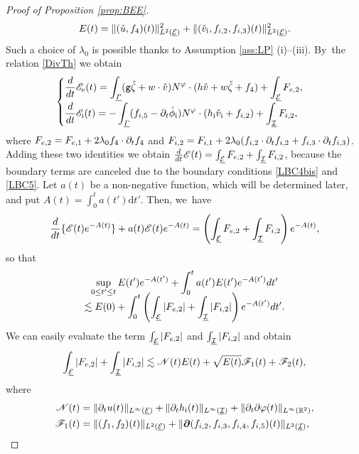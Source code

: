 \documentclass[11pt]{article}
\providecommand{\dpl}{\displaystyle}
\let\dpl\displaystyle
\newcommand{\gr}{{\mathtt g}}
\newcommand{\R}{{\mathbb R}}
\newcommand{\dt}{\partial_t}
\newcommand{\cI}{{\mathcal I}}
\newcommand{\cE}{{\mathcal E}}
\newcommand{\ul}[1]{\underline{#1}}
\newcommand{\itGamma}{\mathit{\Gamma}}
\theoremstyle{definition}
\begin{document}
\begin{proof}[Proof of Proposition \ref{prop:BEE}]
\[
E(t)=\|(\check{u},f_4)(t)\|_{L^2(\ul{\cE})}^2+\|(\check{v}_\mathrm{i},f_{{\rm i},2},f_{{\rm i},3})(t)\|_{L^2(\ul{\cE})}^2.
\]
Such a choice of $\lambda_0$ is possible thanks to Assumption \ref{ass:LP} (i)--(iii). By~the relation \eqref{DivTh} we obtain
\begin{equation}\label{BEI}
\begin{cases}
\dpl\frac{\rm d}{{\rm d}t}\mathscr{E}_\mathrm{e}(t) = \int_{\ul{\itGamma}}(\gr\check{\zeta}+w\cdot\check{v})N^\varphi\cdot(h\check{v}+w\check{\zeta}+f_4)
+ \int_{\ul{\cE}}F_{{\rm e},2}, \\[8pt]
\dpl\frac{\rm d}{{\rm d}t}\mathscr{E}_\mathrm{i}(t) = -\int_{\ul{\itGamma}}(f_{{\rm i},5}-\dt\check{\phi}_\mathrm{i})N^\varphi\cdot(h_\mathrm{i}\check{v}_\mathrm{i}+f_{{\rm i},2})
+ \int_{\ul{\cI}}F_{{\rm i},2},
\end{cases}
\end{equation}
where $F_{{\rm e},2}=F_{{\rm e},1}+2\lambda_0f_4\cdot\dt f_4$ and
$F_{{\rm i},2}=F_{{\rm i},1}+2\lambda_0(f_{{\rm i},2}\cdot\dt f_{{\rm i},2} + f_{{\rm i},3}\cdot\dt f_{{\rm i},3})$.
Adding these two identities we obtain $\frac{\rm d}{{\rm d}t}\mathscr{E}(t)=\int_{\ul{\cE}}F_{{\rm e},2}+\int_{\ul{\cI}}F_{{\rm i},2}$,
because the boundary terms are canceled due to the boundary conditions \eqref{LBC4bis} and \eqref{LBC5}.
Let $a(t)$ be a non-negative function, which will be determined later, and put $A(t)=\int_0^t a(t')\mathrm{d}t'$.
Then, we~have
\[
\frac{\rm d}{{\rm d}t}\{ \mathscr{E}(t)e^{-A(t)} \} + a(t)\mathscr{E}(t)e^{-A(t)}
= \left(\int_{\ul{\cE}}F_{{\rm e},2}+\int_{\ul{\cI}}F_{{\rm i},2} \right) e^{-A(t)},
\]
so that
\begin{multline*}
\sup_{0\leq t'\leq t}E(t')e^{-A(t')} +\int_0^t a(t')E(t')e^{-A(t')}{\rm d}t' \\[-8pt]
\lesssim E(0) + \int_0^t \left(\int_{\ul{\cE}}|F_{{\rm e},2}|+\int_{\ul{\cI}}|F_{{\rm i},2}| \right) e^{-A(t')} {\rm d}t'.
\end{multline*}
We can easily evaluate the term $\int_{\ul{\cE}}|F_{{\rm e},2}|$ and $\int_{\ul{\cI}}|F_{{\rm i},2}|$ and obtain
\[
\int_{\ul{\cE}}|F_{{\rm e},2}|+\int_{\ul{\cI}}|F_{{\rm i},2}|
\lesssim \mathscr{N}(t)E(t)+\sqrt{E(t)}\mathscr{F}_1(t)+\mathscr{F}_2(t),
\]
where
\begin{align*}
\mathscr{N}(t)
&= \|\dt u(t)\|_{L^\infty(\ul{\cE})}+\|\dt h_\mathrm{i}(t)\|_{L^\infty(\ul{\cI})}+\|\dt\partial\varphi(t)\|_{L^\infty(\R^2)}, \\
\mathscr{F}_1(t)
&= \|(f_1,f_2)(t)\|_{L^2(\ul{\cE})} + \|\bm{\partial}(f_{{\rm i},2},f_{{\rm i},3},f_{{\rm i},4},f_{{\rm i},5})(t)\|_{L^2(\ul{\cI})}, \\

\end{align*}
\end{proof}
\end{document}
